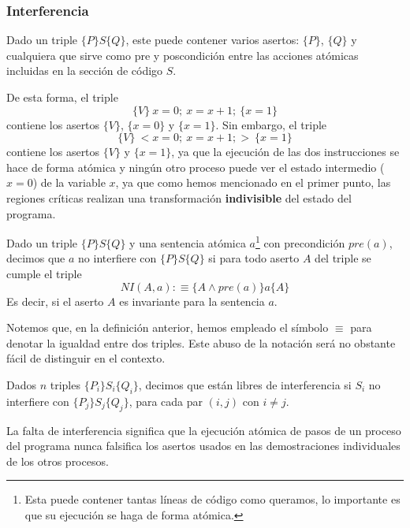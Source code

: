 \subsubsection{Interferencia}
Dado un triple $\{P\}S\{Q\}$, este puede contener varios asertos: $\{P\}$, $\{Q\}$ y cualquiera que sirve como pre y poscondición entre las acciones atómicas incluidas en la sección de código $S$.
\begin{ejemplo}
    De esta forma, el triple 
    \begin{equation*}
        \{V\}\ x=0;\ x=x+1;\ \{x=1\} 
    \end{equation*}
    contiene los asertos $\{V\}$, $\{x=0\}$ y $\{x=1\}$. Sin embargo, el triple 
    \begin{equation*}
        \{V\}\ <x=0;\ x=x+1;>\ \{x=1\}
    \end{equation*}
    contiene los asertos $\{V\}$ y $\{x=1\}$, ya que la ejecución de las dos instrucciones se hace de forma atómica y ningún otro proceso puede ver el estado intermedio ($x=0$) de la variable $x$, ya que como hemos mencionado en el primer punto, las regiones críticas realizan una transformación \textbf{indivisible} del estado del programa.
\end{ejemplo}
\begin{definicion}[Interferencia]
    Dado un triple $\{P\}S\{Q\}$ y una sentencia atómica $a$\footnote{Esta puede contener tantas líneas de código como queramos, lo importante es que su ejecución se haga de forma atómica.} con precondición $pre(a)$, decimos que $a$ no interfiere con $\{P\}S\{Q\}$ si para todo aserto $A$ del triple se cumple el triple
    \begin{equation*}
        NI(A, a) :\equiv \{A \land pre(a)\} a \{A\}
    \end{equation*}
    Es decir, si el aserto $A$ es invariante para la sentencia $a$.
\end{definicion}
\begin{observacion}
    Notemos que, en la definición anterior, hemos empleado el símbolo $\equiv$ para denotar la igualdad entre dos triples.
    Este abuso de la notación será no obstante fácil de distinguir en el contexto.
\end{observacion}
\begin{definicion}
    Dados $n$ triples $\{P_i\}S_i\{Q_i\}$, decimos que están libres de interferencia si $S_i$ no interfiere con $\{P_j\}S_j\{Q_j\}$, para cada par $(i,j)$ con $i\neq j$.
\end{definicion}
La falta de interferencia significa que la ejecución atómica de pasos de un proceso del programa nunca falsifica los asertos usados en las demostraciones individuales de los otros procesos.

